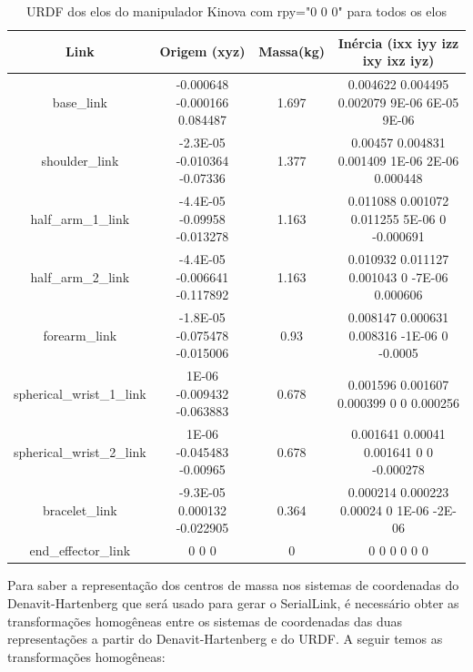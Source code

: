 \documentclass[10pt]{article}
\begin{document}
\begin{table}[h!]
    \centering
    \begin{tabular}{|c|c|c|c|}
    \hline
    \textbf{Link}          & \textbf{Origem (xyz)}   & \textbf{Massa(kg)} & \textbf{Inércia (ixx iyy izz ixy ixz iyz)} \\ \hline
    base\_link             & -0.000648 -0.000166 0.084487 & 1.697               & 0.004622 0.004495 0.002079 9E-06 6E-05 9E-06 \\ \hline
    shoulder\_link         & -2.3E-05 -0.010364 -0.07336  & 1.377               & 0.00457 0.004831 0.001409 1E-06 2E-06 0.000448 \\ \hline
    half\_arm\_1\_link     & -4.4E-05 -0.09958 -0.013278  & 1.163               & 0.011088 0.001072 0.011255 5E-06 0 -0.000691 \\ \hline
    half\_arm\_2\_link     & -4.4E-05 -0.006641 -0.117892 & 1.163               & 0.010932 0.011127 0.001043 0 -7E-06 0.000606 \\ \hline
    forearm\_link          & -1.8E-05 -0.075478 -0.015006 & 0.93                & 0.008147 0.000631 0.008316 -1E-06 0 -0.0005 \\ \hline
    spherical\_wrist\_1\_link & 1E-06 -0.009432 -0.063883  & 0.678               & 0.001596 0.001607 0.000399 0 0 0.000256 \\ \hline
    spherical\_wrist\_2\_link & 1E-06 -0.045483 -0.00965   & 0.678               & 0.001641 0.00041 0.001641 0 0 -0.000278 \\ \hline
    bracelet\_link         & -9.3E-05 0.000132 -0.022905  & 0.364               & 0.000214 0.000223 0.00024 0 1E-06 -2E-06 \\ \hline
    end\_effector\_link    & 0 0 0                     & 0                   & 0 0 0 0 0 0 \\ \hline
    \end{tabular}
    \caption{URDF dos elos do manipulador Kinova com rpy="0 0 0" para todos os elos}
    \label{tab:links}
\end{table}
Para saber a representação dos centros de massa nos sistemas de coordenadas do Denavit-Hartenberg que será usado para gerar o SerialLink,
é necessário  obter as transformações homogêneas entre os sistemas de coordenadas das duas representações a partir do Denavit-Hartenberg e do URDF.
A seguir temos as transformações homogêneas:
\end{document}
